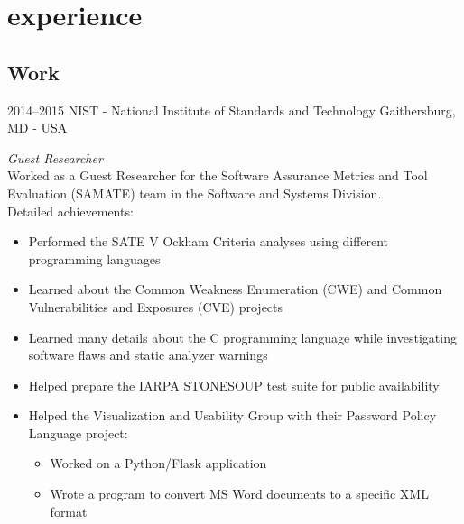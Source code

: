 \documentclass[]{friggeri-cv} %
\begin{document}

\section{experience}

\subsection{Work}

\begin{entrylist}


\entry
{2014--2015}
{NIST - National Institute of Standards and Technology}
{Gaithersburg, MD - USA}
{\emph{Guest Researcher} \\
  Worked as a Guest Researcher for the Software Assurance Metrics and Tool Evaluation (SAMATE) team in the Software and Systems Division. \\
Detailed achievements:
\begin{itemize}
\item Performed the SATE V Ockham Criteria analyses using different programming languages
\item Learned about the Common Weakness Enumeration (CWE) and Common Vulnerabilities and Exposures (CVE) projects
\item Learned many details about the C programming language while investigating software flaws and static analyzer warnings
\item Helped prepare the IARPA STONESOUP test suite for public availability
\item Helped the Visualization and Usability Group with their Password Policy Language project:
  \begin{itemize}
    \item Worked on a Python/Flask application
    \item Wrote a program to convert MS Word documents to a specific XML format
  \end{itemize}
\end{itemize}}



\end{entrylist}
\end{document}
